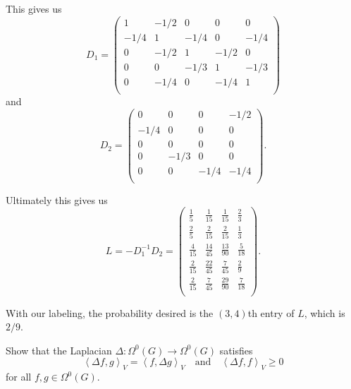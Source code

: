 \documentclass[12 pt, letterpaper]{hmcpset}
\begin{document}
\begin{solution}
\begin{enumerate}
			This gives us
			\[
				D_{1} = \begin{pmatrix}
			1 & -1/2 & 0 & 0 & 0 \\
			-1/4 & 1 & -1/4 & 0 & -1/4 \\
			0 & -1/2 & 1 & -1/2 & 0 \\
			0 & 0 & -1/3 & 1 & -1/3 \\
			0 & -1/4 & 0 & -1/4 & 1 \\
		\end{pmatrix} 
		\]
		and
		\[
			D_{2} = \begin{pmatrix}
			0 & 0 & 0 & -1/2 \\
			-1/4 & 0 & 0 & 0 \\
			0 & 0 & 0 & 0 \\
			0 & -1/3 & 0 & 0 \\
			0 & 0 & -1/4 & -1/4 \\
		\end{pmatrix}.
			\]

		Ultimately this gives us
		\[
			L = -D_{1}^{-1} D_{2} = \begin{pmatrix}
\frac{1}{5} & \frac{ 1}{15} & \frac{ 1}{15} & \frac{ 2}{3} \\
\frac{ 2}{5} & \frac{ 2}{15} & \frac{ 2}{15} & \frac{ 1}{3} \\
\frac{4}{15} & \frac{14}{45} & \frac{13}{90} & \frac{5}{18} \\
\frac{2}{15} & \frac{22}{45} & \frac{ 7}{45} & \frac{ 2}{9} \\
\frac{2}{15} & \frac{ 7}{45} & \frac{29}{90} & \frac{7}{18} \\
 
\end{pmatrix}.
		\]
	\end{enumerate}

	With our labeling, the probability desired is the $(3, 4)$th entry of $L$, which is $2 / 9$.
\end{solution}

\pagebreak

\begin{problem}[42.]
	Show that the Laplacian $\Delta : \Omega^{0}(G) \to \Omega^{0}(G)$ satisfies
	\[
		\left < \Delta f, g \right >_{V} = \left < f, \Delta g \right >_{V} \quad \text{and} \quad \left < \Delta f, f \right >_{V} \ge 0
	\]
	for all $f, g \in \Omega^{0}(G)$.
\end{problem}
\end{document}
